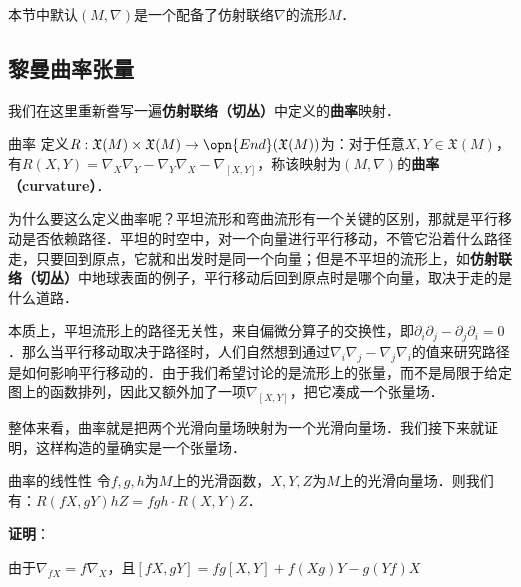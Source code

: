 

本节中默认$(M, \nabla)$是一个配备了仿射联络$\nabla$的流形$M$．

\subsection{黎曼曲率张量}

我们在这里重新誊写一遍\textbf{仿射联络（切丛）}中定义的\textbf{曲率}映射．

\begin{definition}{曲率}
定义$R:\mathfrak{X}(M)\times\mathfrak{X}(M)\to\opn{End}(\mathfrak{X}(M))$为：对于任意$X, Y\in\mathfrak{X}(M)$，有$R(X, Y)=\nabla_X\nabla_Y-\nabla_Y\nabla_X-\nabla_{[X, Y]}$，称该映射为$(M, \nabla)$的\textbf{曲率（curvature）}．
\end{definition}

为什么要这么定义曲率呢？平坦流形和弯曲流形有一个关键的区别，那就是平行移动是否依赖路径．平坦的时空中，对一个向量进行平行移动，不管它沿着什么路径走，只要回到原点，它就和出发时是同一个向量；但是不平坦的流形上，如\textbf{仿射联络（切丛）}中地球表面的例子，平行移动后回到原点时是哪个向量，取决于走的是什么道路．

本质上，平坦流形上的路径无关性，来自偏微分算子的交换性，即$\partial_i\partial_j-\partial_j\partial_i=0$．那么当平行移动取决于路径时，人们自然想到通过$\nabla_i\nabla_j-\nabla_j\nabla_i$的值来研究路径是如何影响平行移动的．由于我们希望讨论的是流形上的张量，而不是局限于给定图上的函数排列，因此又额外加了一项$\nabla_{[X, Y]}$，把它凑成一个张量场．

整体来看，曲率就是把两个光滑向量场映射为一个光滑向量场．我们接下来就证明，这样构造的量确实是一个张量场．

\begin{theorem}{曲率的线性性}\label{RicciC_the1}
令$f, g, h$为$M$上的光滑函数，$X, Y, Z$为$M$上的光滑向量场．则我们有：$R(fX, gY)hZ=fgh\cdot R(X, Y)Z$．
\end{theorem}

\textbf{证明}：

由于$\nabla_{fX}=f\nabla_X$，且$[fX, gY]=fg[X, Y]+f(Xg)Y-g(Yf)X$

